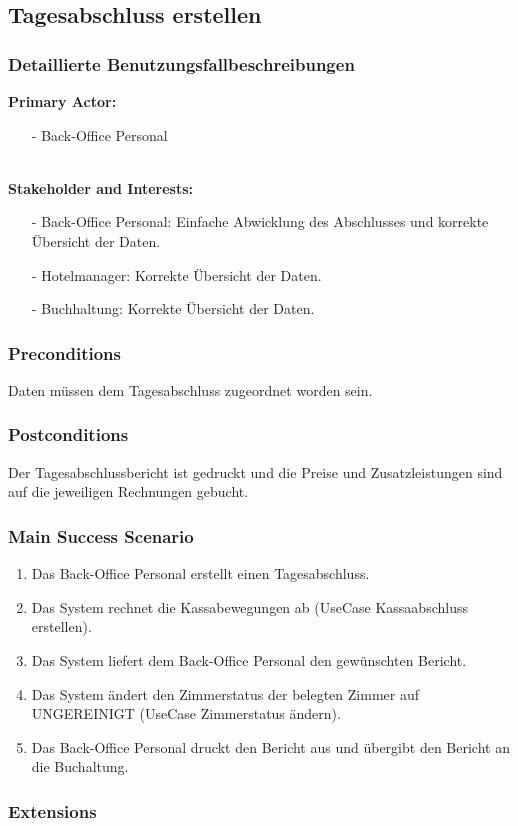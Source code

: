 \documentclass[./detailed_overview_usecases.tex]{subfiles}
\begin{document}
    \subsection{Tagesabschluss erstellen}
    \subsubsection{Detaillierte Benutzungsfallbeschreibungen}
    \textbf{Primary Actor: }
    \begin{itemize}
        \item [-] Back-Office Personal
    \end{itemize}
    \\
    \textbf{Stakeholder and Interests:}
    \begin{itemize}
        \item[-] Back-Office Personal: Einfache Abwicklung des Abschlusses und korrekte Übersicht der Daten.
        \item[-] Hotelmanager: Korrekte Übersicht der Daten.
        \item[-] Buchhaltung: Korrekte Übersicht der Daten.
    \end{itemize}

    \subsubsection*{Preconditions}
    Daten müssen dem Tagesabschluss zugeordnet worden sein.
    \subsubsection*{Postconditions}
    Der Tagesabschlussbericht ist gedruckt und die Preise und Zusatzleistungen sind auf die jeweiligen Rechnungen gebucht.

    \subsubsection*{Main Success Scenario}
    \begin{enumerate}
        \item Das Back-Office Personal erstellt einen Tagesabschluss.
        \item Das System rechnet die Kassabewegungen ab (UseCase Kassaabschluss erstellen).
        \item Das System liefert dem Back-Office Personal den gewünschten Bericht.
        \item Das System ändert den Zimmerstatus der belegten Zimmer auf UNGEREINIGT (UseCase Zimmerstatus ändern).
        \item Das Back-Office Personal druckt den Bericht aus und übergibt den Bericht an die Buchaltung.
    \end{enumerate}

    \subsubsection*{Extensions}
\end{document}
